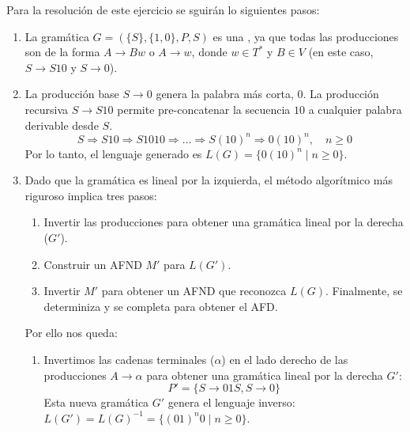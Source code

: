\begin{solucion}
Para la resolución de este ejercicio se sguirán lo siguientes pasos:

\begin{enumerate}
    \item {}

    La gramática $G = (\{S\}, \{1, 0\}, P, S)$ es una , ya que todas las producciones son de la forma $A \to Bw$ o $A \to w$, donde $w \in T^*$ y $B \in V$ (en este caso, $S \to S10$ y $S \to 0$).

    \item {}
    La producción base $S \to 0$ genera la palabra más corta, $0$. La producción recursiva $S \to S10$ permite pre-concatenar la secuencia $10$ a cualquier palabra derivable desde $S$.
    $$
    S \Rightarrow S10 \Rightarrow S1010 \Rightarrow \dots \Rightarrow S(10)^n \Rightarrow 0(10)^n, \quad n \geq 0
    $$
    Por lo tanto, el lenguaje generado es $L(G) = \{0(10)^n \mid n \geq 0\}$.

    \item {}

    Dado que la gramática es lineal por la izquierda, el método algorítmico más riguroso implica tres pasos:
    \begin{enumerate}
        \item Invertir las producciones para obtener una gramática lineal por la derecha ($G'$).
        \item Construir un AFND $M'$ para $L(G')$.
        \item Invertir $M'$ para obtener un AFND que reconozca $L(G)$. Finalmente, se determiniza y se completa para obtener el AFD.
    \end{enumerate}

    Por ello nos queda:

    \begin{enumerate}
        \item {}

        Invertimos las cadenas terminales ($\alpha$) en el lado derecho de las producciones $A \to \alpha$ para obtener una gramática lineal por la derecha $G'$:
        $$
        P' = \{S \to 01S, S \to 0\}
        $$
        Esta nueva gramática $G'$ genera el lenguaje inverso: $L(G') = L(G)^{-1} = \{(01)^n 0 \mid n \geq 0\}$.


\end{enumerate}
\end{enumerate}
\end{solucion}
